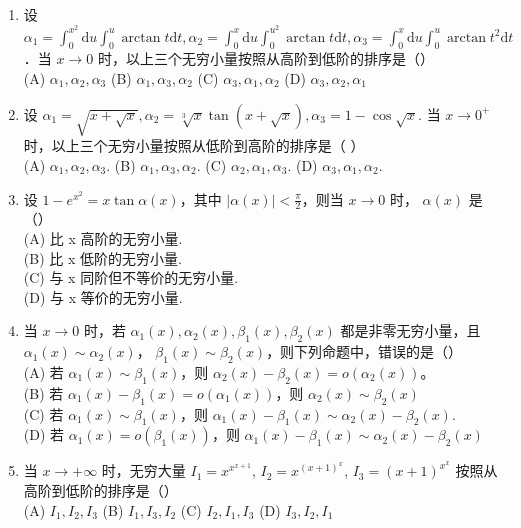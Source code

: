 \documentclass[12pt, a4paper]{ctexart}
\begin{document}
\begin{enumerate}
    \item 设 $ \alpha_{1}=\int_{0}^{x^{2}}\mathrm{d}u\int_{0}^{u}\arctan t\mathrm{d}t,\alpha_{2}=\int_{0}^{x}\mathrm{d}u\int_{0}^{u^{2}}\arctan t\mathrm{d}t,\alpha_{3}=\int_{0}^{x}\mathrm{d}u\int_{0}^{u}\arctan t^{2}\mathrm{d}t $．当 $ x\to0 $ 时，以上三个无穷小量按照从高阶到低阶的排序是（）\\
    (A) $ \alpha_{1},\alpha_{2},\alpha_{3} $ \quad (B) $ \alpha_{1},\alpha_{3},\alpha_{2} $ \quad (C) $ \alpha_{3},\alpha_{1},\alpha_{2} $ \quad (D) $ \alpha_{3},\alpha_{2},\alpha_{1} $

    \item 设 $ \alpha_1 = \sqrt{x + \sqrt{x}}, \alpha_2 = \sqrt[3]{x} \tan\left(x + \sqrt{x}\right), \alpha_3 = 1 - \cos\sqrt{x} $. 当 $ x \to 0^+ $ 时，以上三个无穷小量按照从低阶到高阶的排序是（ ）\\
    (A) $ \alpha_1, \alpha_2, \alpha_3 $. \quad (B) $ \alpha_1, \alpha_3, \alpha_2 $. \quad (C) $ \alpha_2, \alpha_1, \alpha_3 $. \quad (D) $ \alpha_3, \alpha_1, \alpha_2 $.

    \item 设 $ 1 - e^{x^2} = x \tan \alpha(x) $，其中 $ \left| \alpha(x) \right| < \frac{\pi}{2} $，则当 $ x \to 0 $ 时， $ \alpha(x) $ 是（）\\
    (A) 比 x 高阶的无穷小量.\\
    (B) 比 x 低阶的无穷小量.\\
    (C) 与 x 同阶但不等价的无穷小量.\\
    (D) 与 x 等价的无穷小量.

    \item 当 $ x \to 0 $ 时，若 $ \alpha_{1}(x), \alpha_{2}(x), \beta_{1}(x), \beta_{2}(x) $ 都是非零无穷小量，且 $ \alpha_{1}(x) \sim \alpha_{2}(x) $， $ \beta_{1}(x) \sim \beta_{2}(x) $，则下列命题中，错误的是（）\\
    (A) 若 $ \alpha_{1}(x) \sim \beta_{1}(x) $，则 $ \alpha_{2}(x) - \beta_{2}(x) = o(\alpha_{2}(x)) $。\\
    (B) 若 $ \alpha_{1}(x)-\beta_{1}(x)=o(\alpha_{1}(x)) $，则 $ \alpha_{2}(x)\sim\beta_{2}(x) $\\
    (C) 若 $ \alpha_{1}(x) \sim \beta_{1}(x) $，则 $ \alpha_{1}(x) - \beta_{1}(x) \sim \alpha_{2}(x) - \beta_{2}(x) $.\\
    (D) 若 $ \alpha_{1}(x)=o\left(\beta_{1}(x)\right) $，则 $ \alpha_{1}(x)-\beta_{1}(x)\sim\alpha_{2}(x)-\beta_{2}(x) $

    \item 当 $ x \to +\infty $ 时，无穷大量 $ I_{1} = x^{x^{x+1}} $, $ I_{2} = x^{(x+1)^{x}} $, $ I_{3} = (x+1)^{x^{x}} $ 按照从高阶到低阶的排序是（）\\
    (A) $ I_{1}, I_{2}, I_{3} $ \quad (B) $ I_{1}, I_{3}, I_{2} $ \quad (C) $ I_{2}, I_{1}, I_{3} $ \quad (D) $ I_{3}, I_{2}, I_{1} $


\end{enumerate}
\end{document}
